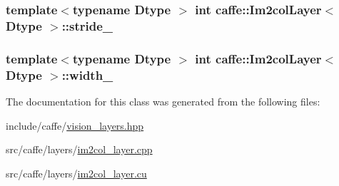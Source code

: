 \hypertarget{classcaffe_1_1_im2col_layer_a03923aa2de104271d4df535316871b3b}{
\subsubsection[{stride\+\_\+}]{\setlength{\rightskip}{0pt plus 5cm}template$<$typename Dtype $>$ int {\bf caffe\+::\+Im2col\+Layer}$<$ Dtype $>$\+::stride\+\_\+\hspace{0.3cm}{\ttfamily [protected]}}}\label{classcaffe_1_1_im2col_layer_a03923aa2de104271d4df535316871b3b}
\hypertarget{classcaffe_1_1_im2col_layer_a6d888c45c786826e1acabd97213e45a6}{
\subsubsection[{width\+\_\+}]{\setlength{\rightskip}{0pt plus 5cm}template$<$typename Dtype $>$ int {\bf caffe\+::\+Im2col\+Layer}$<$ Dtype $>$\+::width\+\_\+\hspace{0.3cm}{\ttfamily [protected]}}}\label{classcaffe_1_1_im2col_layer_a6d888c45c786826e1acabd97213e45a6}


The documentation for this class was generated from the following files\+:\begin{DoxyCompactItemize}
\item 
include/caffe/\hyperlink{vision__layers_8hpp}{vision\+\_\+layers.\+hpp}\item 
src/caffe/layers/\hyperlink{im2col__layer_8cpp}{im2col\+\_\+layer.\+cpp}\item 
src/caffe/layers/\hyperlink{im2col__layer_8cu}{im2col\+\_\+layer.\+cu}\end{DoxyCompactItemize}
